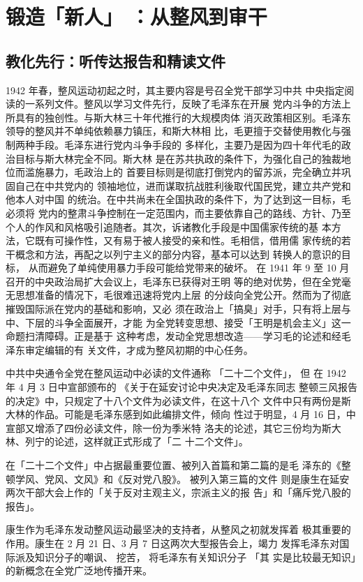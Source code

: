 \chapter{锻造「新人」
：从整风到审干}
\section{教化先行：听传达报告和精读文件}
1942 年春，整风运动初起之时，其主要内容是号召全党干部学习中共
中央指定阅读的一系列文件。整风以学习文件先行，反映了毛泽东在开展
党内斗争的方法上所具有的独创性。与斯大林三十年代推行的大规模肉体
消灭政策相区别。毛泽东领导的整风并不单纯依赖暴力镇压，和斯大林相
比，毛更擅于交替使用教化与强制两种手段。毛泽东进行党内斗争手段的
多样化，主要乃是因为四十年代毛的政治目标与斯大林完全不同。斯大林
是在苏共执政的条件下，为强化自己的独裁地位而滥施暴力，毛政治上的
首要目标则是彻底打倒党内的留苏派，完全确立并巩固自己在中共党内的
领袖地位，进而谋取抗战胜利後取代国民党，建立共产党和他本人对中国
的统治。在中共尚未在全国执政的条件下，为了达到这一目标，毛必须将
党内的整肃斗争控制在一定范围内，而主要依靠自己的路线、方针、乃至
个人的作风和风格吸引追随者。其次，诉诸教化手段是中国儒家传统的基
本方法，它既有可操作性，又有易于被人接受的亲和性。毛相信，借用儒
家传统的若干概念和方法，再配之以列宁主义的部分内容，基本可以达到
转换人的意识的目标，
从而避免了单纯使用暴力手段可能给党带来的破坏。
在 1941 年 9 至 10 月召开的中央政治局扩大会议上，毛泽东已获得对王明
等的绝对优势，但在全党毫无思想准备的情况下，毛很难迅速将党内上层
的分歧向全党公开。然而为了彻底摧毁国际派在党内的基础和影响，又必
须在政治上「搞臭」对手，只有将上层与中、下层的斗争全面展开，才能
为全党转变思想、接受「王明是机会主义」这一命题扫清障碍。正是基于
这种考虑，发动全党思想改造——学习毛的论述和经毛泽东审定编辑的有
关文件，才成为整风初期的中心任务。

中共中央通令全党在整风运动中必读的文件通称
「二十二个文件」， 但
在 1942 年 4 月 3 日中宣部颁布的
《关于在延安讨论中央决定及毛泽东同志
整顿三风报告的决定》中，只规定了十八个文件为必读文件，在这十八个
文件中只有两份是斯大林的作品。可能是毛泽东感到如此编排文件，倾向
性过于明显，4 月 16 日，中宣部又增添了四份必读文件，除一份为季米特
洛夫的论述，其它三份均为斯大林、列宁的论述，这样就正式形成了「二
十二个文件」。

在「二十二个文件」中占据最重要位置、被列入首篇和第二篇的是毛
泽东的《整顿学风、党风、文风》和《反对党八股》。
被列入第三篇的文件
则是康生在延安两次干部大会上作的「关于反对主观主义，宗派主义的报
告」和「痛斥党八股的报告」。

康生作为毛泽东发动整风运动最坚决的支持者，从整风之初就发挥着
极其重要的作用。康生在 2 月 21 日、3 月 7 日这两次大型报告会上，竭力
发挥毛泽东对国际派及知识分子的嘲讽、
挖苦，
将毛泽东有关知识分子
「其
实是比较最无知识」的新概念在全党广泛地传播开来。

